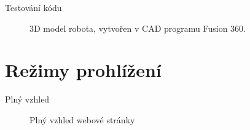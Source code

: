 \documentclass[14pt, hyperref={unicode}]{beamer}
\newcommand{\Desktop}{\fixfaIcon{Desktop}}
\begin{document}
  \begin{frame}[fragile]{Testování kódu}
    \begin{figure}[H]
      \centering

      \hfill

      \caption[3D model robota]{3D model robota, vytvořen v CAD programu Fusion 360.}%
    \end{figure}
  \end{frame}

  \section{Režimy prohlížení}

  \begin{frame}{\texorpdfstring{Plný vzhled\hfill\Desktop}{Plný vzhled}}
    \begin{figure}[H]
      \caption{Plný vzhled webové stránky}
    \end{figure}
  \end{frame}
\end{document}
